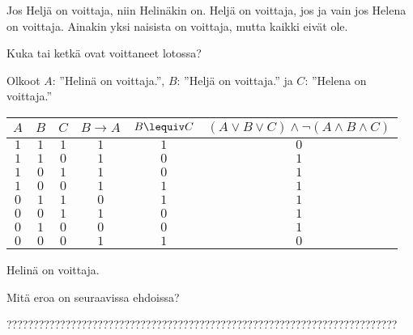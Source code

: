 \begin{tehtavasivu}
\begin{tehtava}
Jos Heljä on voittaja, niin Helinäkin on. 
Heljä on voittaja, jos ja vain jos Helena on voittaja.
Ainakin yksi naisista on voittaja, mutta kaikki eivät ole.

Kuka tai ketkä ovat voittaneet lotossa?

    \begin{vastaus}
    
        Olkoot $A$: ''Helinä on voittaja.'', $B$: ''Heljä on voittaja.'' ja $C$: ''Helena on voittaja.''
        \begin{center}
		    \begin{tabular}{|c|c|c|c|c|c|}\hline
		    $A$ & $B$ & $C$ & $B\to A$ & $B\lequiv C$ & $(A\lor B\lor C)\land \lnot(A\land B\land C)$ \\ \hline
		    $1$ & $1$ & $1$ & $1$ & $1$ & $0$ \\ %
		    $1$ & $1$ & $0$ & $1$ & $0$ & $1$ \\
		    $1$ & $0$ & $1$ & $1$ & $0$ & $1$ \\
		    $1$ & $0$ & $0$ & $1$ & $1$ & $1$ \\
		    $0$ & $1$ & $1$ & $0$ & $1$ & $1$ \\
		    $0$ & $0$ & $1$ & $1$ & $0$ & $1$ \\
		    $0$ & $1$ & $0$ & $0$ & $0$ & $1$ \\
		    $0$ & $0$ & $0$ & $1$ & $1$ & $0$ \\ \hline
\end{tabular}
\end{center}
Helinä on voittaja.
    \end{vastaus}
    
\end{tehtava}

\begin{tehtava}
     Mitä eroa on seuraavissa ehdoissa?
    \begin{alakohdat}
    \end{alakohdat}

    \begin{vastaus}
    
       ????????????????????????????????????????????????????????????????????????? %
    \end{vastaus}
    

\end{tehtava}
\end{tehtavasivu}
